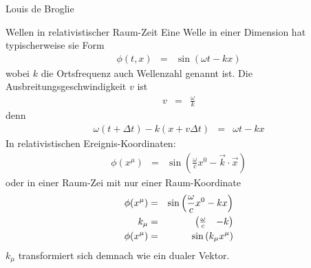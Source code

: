 \begin{chapter}{\titlestr}
\begin{section}{Louis de Broglie}
\begin{subsection}{Wellen in relativistischer Raum-Zeit}
Eine Welle in einer Dimension hat typischerweise sie Form
\begin{eqnarray*}
\phi(t,x) &=& \sin(\omega t-kx)
\end{eqnarray*}
wobei $k$ die Ortsfrequenz auch Wellenzahl genannt ist. Die Ausbreitungsgeschwindigkeit $v$ ist
\begin{eqnarray*}
v &=& \frac{\omega}{k}
\end{eqnarray*}
denn
\begin{eqnarray*}
\omega(t+\Delta t)-k(x+v\Delta t) &=& \omega t-kx
\end{eqnarray*}
In relativistischen Ereignis-Koordinaten:
\begin{eqnarray*}
\phi(x^\mu) &=& \sin\left(\frac{\omega}{c}x^0-\vec{k}\cdot\vec{x}\right)
\end{eqnarray*}
oder in einer Raum-Zei mit nur einer Raum-Koordinate
\begin{eqnarray*}
\phi(x^\mu) &=& \sin\left(\frac{\omega}{c}x^0-kx\right)\\
k_\mu &=& \begin{pmatrix}\frac{\omega}{c} & -k\end{pmatrix}\\
\phi(x^\mu) &=& \sin\left(k_\mu x^\mu\right)
\end{eqnarray*}
$k_\mu$ transformiert sich demnach wie ein dualer Vektor.
\end{subsection}


\end{section}
\end{chapter}
